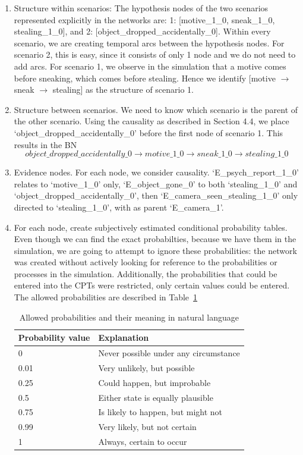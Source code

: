 \documentclass[12pt]{article}
\begin{document}
 \begin{enumerate} 
 
\item Structure within scenarios: The hypothesis nodes of the two scenarios represented explicitly in the networks are: 1: [motive\_1\_0, sneak\_1\_0, stealing\_1\_0], and 2: [object\_dropped\_accidentally\_0]. Within every scenario, we are creating temporal arcs between the hypothesis nodes. For scenario 2, this is easy, since it consists of only 1 node and we do not need to add arcs. For scenario 1, we observe in the simulation that a motive comes before sneaking, which comes before stealing. Hence we identify [motive $\rightarrow$ sneak $\rightarrow$ stealing] as the structure of scenario 1.

\item Structure between scenarios. We need to know which scenario is the parent of the other scenario. Using the causality as described in Section 4.4, we place `object\_dropped\_accidentally\_0' before the first node of scenario 1. This results in the BN \[object\_dropped\_accidentally\_0 \rightarrow motive\_1\_0 \rightarrow sneak\_1\_0 \rightarrow stealing\_1\_0\]

\item Evidence nodes. For each node, we consider causality. `E\_psych\_report\_1\_0' relates to `motive\_1\_0' only, `E\_object\_gone\_0' to both `stealing\_1\_0' and `object\_dropped\_accidentally\_0', then `E\_camera\_seen\_stealing\_1\_0' only directed to `stealing\_1\_0', with as parent `E\_camera\_1'. 

\item For each node, create subjectively estimated conditional probability tables. Even though we can find the exact probabilties, because we have them in the simulation, we are going to attempt to ignore these probabilities: the network was created without actively looking for reference to the probabilities or processes in the simulation. Additionally, the probabilities that could be entered into the CPTs were restricted, only certain values could be entered. The allowed probabilities are described in Table~\ref{atp}


\begin{table}[htbp]
\begin{center}
\begin{tabular}{|l|l|}
\hline
Probability value & Explanation \\
\hline
0 & Never possible under any circumstance \\
0.01 & Very unlikely, but possible \\
0.25 & Could happen, but improbable \\
0.5 & Either state is equally plausible\\
0.75 & Is likely to happen, but might not \\
0.99 & Very likely, but not certain \\
1 & Always, certain to occur \\
\hline
\end{tabular}
\end{center}
\caption{Allowed probabilities and their meaning in natural language}
\label{atp}
\end{table}


\end{enumerate}
\end{document}
